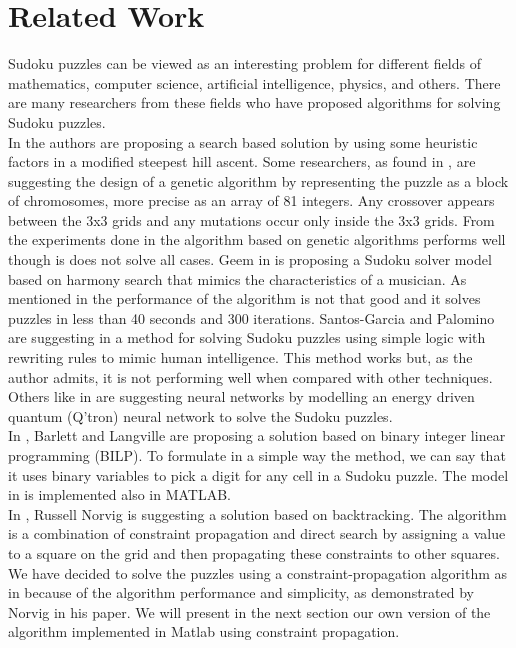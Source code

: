 \documentclass[12pt,a4paper]{article} %
\begin{document}
\section{Related Work}
Sudoku puzzles can be viewed as an interesting problem for different fields of mathematics, computer science, artificial intelligence, physics, and others. There are many researchers from these fields who have proposed algorithms for solving Sudoku puzzles. 
\newline
\\ In \cite{jones2008construction} the authors are proposing a search based solution by using some heuristic factors in a modified steepest hill ascent. Some researchers, as found in \cite{mantere2007solving}, are suggesting the design of a genetic algorithm by representing the puzzle as a block of chromosomes, more precise as an array of 81 integers. Any crossover appears between the 3x3 grids and any mutations occur only inside the 3x3 grids. From the experiments done in \cite{mantere2007solving} the algorithm based on genetic algorithms performs well though is does not solve all cases. Geem in \cite{geem2008harmony} is proposing a Sudoku solver model based on harmony search that mimics the characteristics of a musician. As mentioned in \cite{green2009survey} the performance of the algorithm is not that good and it solves puzzles in less than 40 seconds and 300 iterations. Santos-Garcia and Palomino are suggesting in \cite{santos2007solving} a method for solving Sudoku puzzles using simple logic with rewriting rules to mimic human intelligence. This method works but, as the author admits, it is not performing well when compared with other techniques. Others like in \cite{yue2006sudoku} are suggesting neural networks by modelling an energy driven quantum (Q'tron) neural network to solve the Sudoku puzzles. 
\newline
\\ In \cite{bartlett2006integer}, Barlett and Langville are proposing a solution based on binary integer linear programming (BILP). To formulate in a simple way the method, we can say that it uses binary variables to pick a digit for any cell in a Sudoku puzzle. The model in \cite{bartlett2006integer} is implemented also in MATLAB.
\newline
\\ In \cite{norvigsolving}, Russell Norvig is suggesting a solution based on backtracking. The algorithm is a combination of constraint propagation and direct search by assigning a value to a square on the grid and then propagating these constraints to other squares.
\newline
\\ We have decided to solve the puzzles using a constraint-propagation algorithm as in \cite{norvigsolving} because of the algorithm performance and simplicity, as demonstrated by Norvig in his paper. We will present in the next section our own version of the algorithm implemented in Matlab using constraint propagation.
\end{document}
